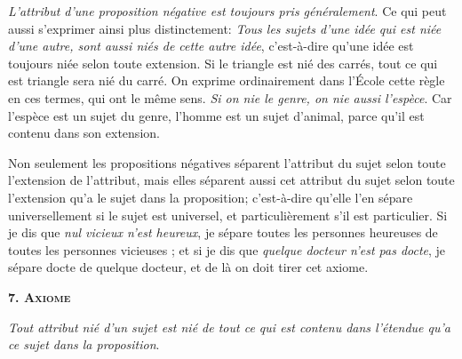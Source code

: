 	\emph{L'attribut d'une proposition négative est toujours pris généralement}. Ce qui peut aussi s'exprimer ainsi plus distinctement: \emph{Tous les sujets d'une idée qui est niée d'une autre, sont aussi niés de cette autre idée}, c'est-à-dire qu'une idée est toujours niée selon toute extension. Si le triangle est nié des carrés, tout ce qui est triangle sera nié du carré. On exprime ordinairement dans l'École cette règle en ces termes, qui ont le même sens. \emph{Si on nie le genre, on nie aussi l'espèce}. Car l'espèce est un sujet du genre, l'homme est un sujet d'animal, parce qu'il est contenu dans son extension.

Non seulement les propositions négatives séparent l'attribut du sujet selon toute l'extension de l'attribut, mais elles séparent aussi cet attribut du sujet selon toute l'extension qu'a le sujet dans la proposition; c'est-à-dire qu'elle l'en sépare universellement si le sujet est universel, et particulièrement s'il est particulier. Si je dis que \emph{nul vicieux n'est heureux}, je sépare toutes les personnes heureuses de toutes les personnes vicieuses ; et si je dis que \emph{quelque docteur n'est pas docte}, je sépare docte de quelque docteur, et de là on doit tirer cet axiome.

\begin{center}{\bfseries\scshape 7. Axiome}\end{center}

	\emph{Tout attribut nié d'un sujet est nié de tout ce qui est contenu dans l'étendue qu'a ce sujet dans la proposition}.


